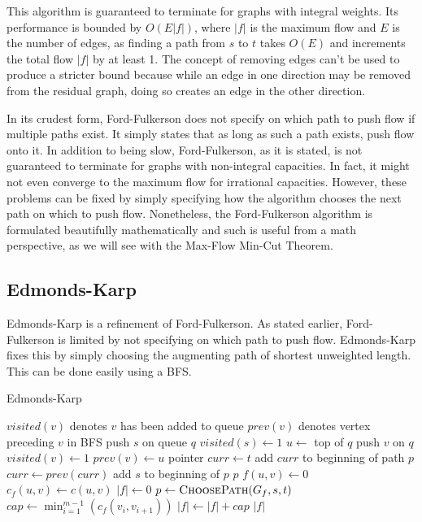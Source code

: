 \documentclass[11pt]{book}
\begin{document}
This algorithm is guaranteed to terminate for graphs with integral weights. Its performance is bounded by $O(E|f|)$, where $|f|$ is the maximum flow and $E$ is the number of edges, as finding a path from $s$ to $t$ takes $O(E)$ and increments the total flow $|f|$ by at least 1. The concept of removing edges can't be used to produce a stricter bound because while an edge in one direction may be removed from the residual graph, doing so creates an edge in the other direction.

In its crudest form, Ford-Fulkerson does not specify on which path to push flow if multiple paths exist. It simply states that as long as such a path exists, push flow onto it. In addition to being slow, Ford-Fulkerson, as it is stated, is not guaranteed to terminate for graphs with non-integral capacities. In fact, it might not even converge to the maximum flow for irrational capacities. However, these problems can be fixed by simply specifying how the algorithm chooses the next path on which to push flow. Nonetheless, the Ford-Fulkerson algorithm is formulated beautifully mathematically and such is useful from a math perspective, as we will see with the Max-Flow Min-Cut Theorem.

\subsection{Edmonds-Karp}

Edmonds-Karp is a refinement of Ford-Fulkerson. As stated earlier, Ford-Fulkerson is limited by not specifying on which path to push flow. Edmonds-Karp fixes this by simply choosing the augmenting path of shortest unweighted length. This can be done easily using a BFS.

\begin{algorithm}[H]
\caption{Edmonds-Karp}
\begin{algorithmic}
	\State $visited(v)$ denotes $v$ has been added to queue
	\State $prev(v)$ denotes vertex preceding $v$ in BFS
	\State push $s$ on queue $q$
	\State $visited(s) \gets 1$
		\State $u \gets $ top of $q$
			\State push $v$ on $q$
			\State $visited(v) \gets 1$
			\State $prev(v) \gets u$
		\EndFor
	\EndWhile
	\State pointer $curr \gets t$
		\State add $curr$ to beginning of path $p$
		\State $curr \gets prev(curr)$
	\EndWhile
	\State add $s$ to beginning of $p$
	\State \Return $p$
\EndFunction
{}
		\State $f(u,v) \gets 0$
		\State $c_f(u,v) \gets c(u,v)$
	\EndFor
	\State $|f| \gets 0$
		\State $p \gets \Call{ChoosePath}{G_f,s,t}$
		\State $cap \gets \min_{i=1}^{m-1}(c_f(v_i,v_{i+1}))$
		\State $|f| \gets |f| + cap$
		\State {}
	\EndWhile
	\Return $|f|$
\EndFunction
\end{algorithmic}
\end{algorithm}
\end{document}
